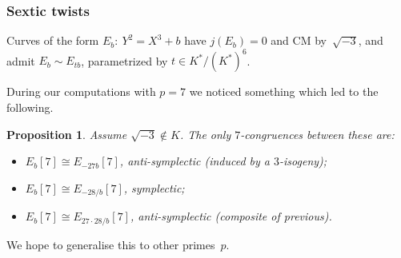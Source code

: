 \documentclass[handout]{beamer}
\newtheorem{prop}{Proposition}
\newcommand{\high}[1]{\emph{\color{blue}{#1}}}
\begin{document}
\begin{frame}\frametitle{Sextic twists}
  Curves of the form $E_b:\ Y^2=X^3+b$ have $j(E_b)=0$ and CM
  by~$\sqrt{-3}$, and admit \high{sextic twists} $E_b\sim E_{tb}$,
  parametrized by $t\in K^*/(K^*)^6$.

  \pause\medskip

  During our computations with $p=7$ we noticed something which led to
  the following.

  \pause\medskip

  \begin{prop}
  Assume $\sqrt{-3}\notin K$.  The only $7$-congruences between these
  are:
  \begin{itemize}
  \item $E_b[7]\cong E_{-27b}[7]$, anti-symplectic (induced by a
    $3$-isogeny);
  \item $E_b[7] \cong E_{-28/b}[7]$, symplectic;
  \item $E_b[7] \cong E_{27\cdot28/b}[7]$, anti-symplectic (composite of
    previous).
  \end{itemize}
  \end{prop}
  \pause\medskip

  We hope to generalise this to other primes~$p$.
\end{frame}

\end{document}
